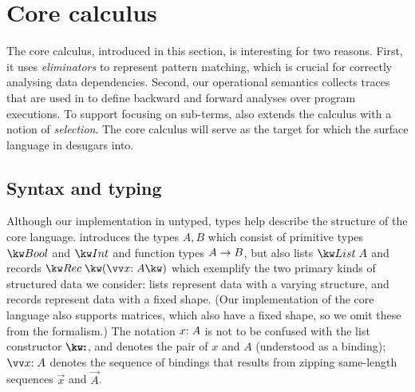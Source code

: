 \section{Core calculus}
\label{sec:core-language}

The core calculus, introduced in this section, is interesting for two reasons. First, it uses \emph{eliminators} to represent pattern matching, which is crucial for correctly analysing data dependencies. Second, our operational semantics collects traces that are used in  to define backward and forward analyses over program executions. To support focusing on sub-terms,  also extends the calculus with a notion of \emph{selection}. The core calculus will serve as the target for which the surface language in  desugars into.


\subsection{Syntax and typing}
\label{sec:core-language:syntax-typing}

Although our implementation in untyped, types help describe the structure of the core language.  introduces the types $A, B$ which consist of primitive types $\tyBool$ and $\tyInt$ and function types ${A}\rightarrow{B}$, but also lists $\tyList{A}$ and records $\tyRec{\vec{\bind{x}{A}}}$ which exemplify the two primary kinds of structured data we consider: lists represent data with a varying structure, and records represent data with a fixed shape. (Our implementation of the core language also supports matrices, which also have a fixed shape, so we omit these from the formalism.) The notation $x{:}\;A$ is not to be confused with the list constructor $\symCons$, and denotes the pair of $x$ and $A$ (understood as a binding); $\seq{\bind{x}{A}}$ denotes the sequence of bindings that results from zipping same-length sequences $\vec{x}$ and $\vec{A}$. 

